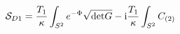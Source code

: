 \begin{equation}
{\cal S}_{D1} =  \frac{T_{1}}{\kappa} \int_{S^2} e^{- \Phi} \sqrt{{\rm
      det} G} - {\rm i}  \frac{T_{1}}{\kappa} \int_{S^2} C_{(2)}
\end{equation}


